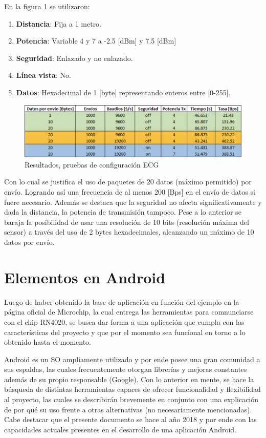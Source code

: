 En la figura \ref{benchmark} se utilizaron:
\begin{enumerate}[]
	\item \textbf{Distancia}:  Fija a 1 metro.
	\item \textbf{Potencia}: Variable {4 y 7} a {-2.5 [dBm] y 7.5 [dBm] }
	\item \textbf{Seguridad}: Enlazado y no enlazado.
	\item \textbf{Línea vista}: No.
	\item \textbf{Datos}: Hexadecimal de 1 [byte] representando enteros entre [0-255].
\end{enumerate}

\begin{figure}[H]
	\centering
	\includegraphics[scale=0.3]{figuras/proto1/benchmark.png}
	\caption{Resultados, pruebas de configuración ECG}
	\label{benchmark}
\end{figure}

Con lo cual se justifica el uso de paquetes de 20 datos (máximo permitido) por envío. Logrando así una frecuencia de al menos 200 [Bps] en el envío de datos si fuere necesario.
Además se destaca que la seguridad no afecta significativamente y dada la distancia, la potencia de transmisión tampoco. Pese a lo anterior se baraja la posibilidad de usar una resolución de 10 bits (resolución máxima del sensor) a través del uso de 2 bytes hexadecimales, alcanzando un máximo de 10 datos por envío.

\section{Elementos en Android}

Luego de haber obtenido la base de aplicación en función del ejemplo en la página oficial de Microchip, la cual entrega las herramientas para comnunciarse con el chip RN4020, se busca dar forma a una aplicación que cumpla con las características del proyecto y que por el momento sea funcional en torno a lo obtenido hasta el momento.

Android es un SO ampliamente utilizado y por ende posee una gran comunidad a sus espaldas, las cuales frecuentemente otorgan librerías y mejoras constantes además de su propio responsable (Google). Con lo anterior en mente, se hace la búsqueda de distintas herramientas capaces de ofrecer funcionalidad y flexibilidad al proyecto, las cuales se describirán brevemente en conjunto con una explicación de por qué su uso frente a otras alternativas (no necesariamente mencionadas). Cabe destacar que el presente documento se hace al año 2018 y por ende con las capacidades actuales presentes en el desarrollo de una aplicación Android.\newline

